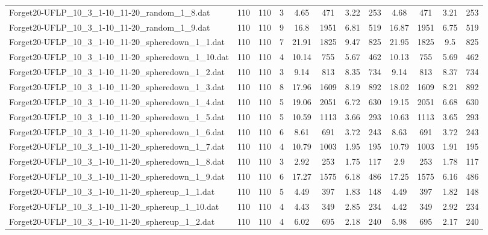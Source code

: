 \begin{sidewaystable}[!ht]
{\begin{tabular}{lccccccccccc}
Forget20-UFLP\_10\_3\_1-10\_11-20\_random\_1\_8.dat & 110 & 110 & 3 & 4.65 & 471 & 3.22 & 253 & 4.68 & 471 &  \textcolor{blue2}{3.21} & 253 \\
Forget20-UFLP\_10\_3\_1-10\_11-20\_random\_1\_9.dat & 110 & 110 & 9 & 16.8 & 1951 & 6.81 & 519 & 16.87 & 1951 &  \textcolor{blue2}{6.75} & 519 \\
Forget20-UFLP\_10\_3\_1-10\_11-20\_spheredown\_1\_1.dat & 110 & 110 & 7 & 21.91 & 1825 & 9.47 & 825 & 21.95 & 1825 & 9.5 & 825 \\
Forget20-UFLP\_10\_3\_1-10\_11-20\_spheredown\_1\_10.dat & 110 & 110 & 4 & 10.14 & 755 &  \textcolor{blue2}{5.67} & 462 & 10.13 & 755 & 5.69 & 462 \\
Forget20-UFLP\_10\_3\_1-10\_11-20\_spheredown\_1\_2.dat & 110 & 110 & 3 & 9.14 & 813 &  \textcolor{blue2}{8.35} & 734 & 9.14 & 813 & 8.37 & 734 \\
Forget20-UFLP\_10\_3\_1-10\_11-20\_spheredown\_1\_3.dat & 110 & 110 & 8 & 17.96 & 1609 & 8.19 & 892 & 18.02 & 1609 & 8.21 & 892 \\
Forget20-UFLP\_10\_3\_1-10\_11-20\_spheredown\_1\_4.dat & 110 & 110 & 5 & 19.06 & 2051 & 6.72 & 630 & 19.15 & 2051 & 6.68 & 630 \\
Forget20-UFLP\_10\_3\_1-10\_11-20\_spheredown\_1\_5.dat & 110 & 110 & 5 & 10.59 & 1113 & 3.66 & 293 & 10.63 & 1113 & 3.65 & 293 \\
Forget20-UFLP\_10\_3\_1-10\_11-20\_spheredown\_1\_6.dat & 110 & 110 & 6 & 8.61 & 691 & 3.72 & 243 & 8.63 & 691 & 3.72 & 243 \\
Forget20-UFLP\_10\_3\_1-10\_11-20\_spheredown\_1\_7.dat & 110 & 110 & 4 & 10.79 & 1003 & 1.95 & 195 & 10.79 & 1003 &  \textcolor{blue2}{1.91} & 195 \\
Forget20-UFLP\_10\_3\_1-10\_11-20\_spheredown\_1\_8.dat & 110 & 110 & 3 & 2.92 & 253 &  \textcolor{blue2}{1.75} & 117 & 2.9 & 253 & 1.78 & 117 \\
Forget20-UFLP\_10\_3\_1-10\_11-20\_spheredown\_1\_9.dat & 110 & 110 & 6 & 17.27 & 1575 & 6.18 & 486 & 17.25 & 1575 & 6.16 & 486 \\
Forget20-UFLP\_10\_3\_1-10\_11-20\_sphereup\_1\_1.dat & 110 & 110 & 5 & 4.49 & 397 & 1.83 & 148 & 4.49 & 397 &  \textcolor{blue2}{1.82} & 148 \\
Forget20-UFLP\_10\_3\_1-10\_11-20\_sphereup\_1\_10.dat & 110 & 110 & 4 & 4.43 & 349 &  \textcolor{blue2}{2.85} & 234 & 4.42 & 349 & 2.92 & 234 \\
Forget20-UFLP\_10\_3\_1-10\_11-20\_sphereup\_1\_2.dat & 110 & 110 & 4 & 6.02 & 695 & 2.18 & 240 & 5.98 & 695 &  \textcolor{blue2}{2.17} & 240 \\

\end{tabular}}
\end{sidewaystable}
